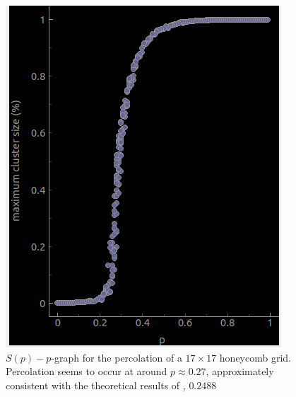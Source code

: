 \documentclass[a4paper,fleqn]{article}
\begin{document}
\begin{figure}[H]
\begin{minipage}{0.3\textwidth}
		\includegraphics*[width=\textwidth]{images/3dgrid}
	\end{minipage}
\caption{$S(p)-p$-graph for the percolation of a $17 \times 17$ honeycomb grid. Percolation seems to occur at around $p \approx 0.27$, approximately consistent with the theoretical results of \cite{Percolation}, $0.2488$ }
\end{figure}

\end{document}
